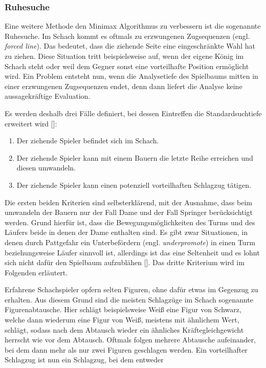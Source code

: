 \subsubsection{Ruhesuche}

Eine weitere Methode den Minimax Algorithmus zu verbessern ist die sogenannte Ruhesuche.
Im Schach kommt es oftmals zu erzwungenen Zugsequenzen (engl. \textit{forced line}).
Das bedeutet, dass die ziehende Seite eine eingeschränkte Wahl hat zu ziehen.
Diese Situation tritt beispielsweise auf, wenn der eigene König im Schach steht oder weil dem Gegner sonst eine vorteilhafte Position ermöglicht wird.
Ein Problem entsteht nun, wenn die Analysetiefe des Spielbaums mitten in einer erzwungenen Zugsequenzen endet, denn dann liefert die Analyse keine aussagekräftige Evaluation.

Es werden deshalb drei Fälle definiert, bei dessen Eintreffen die Standardsuchtiefe erweitert wird [\cite{Stuckardt}]:

\begin{enumerate}
    \item Der ziehende Spieler befindet sich im Schach.
    \item Der ziehende Spieler kann mit einem Bauern die letzte Reihe erreichen und diesen umwandeln.
    \item Der ziehende Spieler kann einen potenziell vorteilhaften Schlagzug tätigen.
\end{enumerate}

Die ersten beiden Kriterien sind selbsterklärend, mit der Ausnahme, dass beim umwandeln der Bauern nur der Fall Dame und der Fall Springer berücksichtigt werden.
Grund hierfür ist, dass die Bewegungsmöglichkeiten des Turms und des Läufers beide in denen der Dame enthalten sind.
Es gibt zwar Situationen, in denen durch Pattgefahr ein Unterbefördern (engl. \textit{underpromote}) in einen Turm beziehungsweise Läufer sinnvoll ist, allerdings ist das eine Seltenheit und es lohnt sich nicht dafür den Spielbaum aufzublähen [\cite{Stuckardt}].
Das dritte Kriterium wird im Folgenden erläutert.

Erfahrene Schachspieler opfern selten Figuren, ohne dafür etwas im Gegenzug zu erhalten.
Aus diesem Grund sind die meisten Schlagzüge im Schach sogenannte Figurenabtausche.
Hier schlägt beispielsweise Weiß eine Figur von Schwarz, welche dann wiederum eine Figur von Weiß, meistens mit ähnlichem Wert, schlägt, sodass nach dem Abtausch wieder ein ähnliches Kräftegleichgewicht herrscht wie vor dem Abtausch.
Oftmals folgen mehrere Abtausche aufeinander, bei dem dann mehr als nur zwei Figuren geschlagen werden.
Ein vorteilhafter Schlagzug ist nun ein Schlagzug, bei dem entweder

